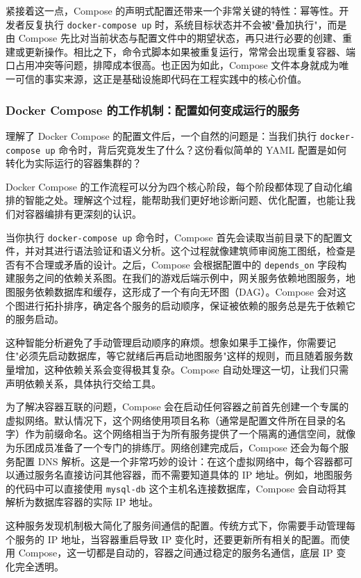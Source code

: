 紧接着这一点，Compose 的声明式配置还带来一个非常关键的特性：幂等性。开发者反复执行 \texttt{docker-compose up} 时，系统目标状态并不会被"叠加执行"，而是由 Compose 先比对当前状态与配置文件中的期望状态，再只进行必要的创建、重建或更新操作。相比之下，命令式脚本如果被重复运行，常常会出现重复容器、端口占用冲突等问题，排障成本很高。也正因为如此，Compose 文件本身就成为唯一可信的事实来源，这正是基础设施即代码在工程实践中的核心价值。

\subsubsection{Docker Compose 的工作机制：配置如何变成运行的服务}

理解了 Docker Compose 的配置文件后，一个自然的问题是：当我们执行 \texttt{docker-compose up} 命令时，背后究竟发生了什么？这份看似简单的 YAML 配置是如何转化为实际运行的容器集群的？

Docker Compose 的工作流程可以分为四个核心阶段，每个阶段都体现了自动化编排的智能之处。理解这个过程，能帮助我们更好地诊断问题、优化配置，也能让我们对容器编排有更深刻的认识。

当你执行 \texttt{docker-compose up} 命令时，Compose 首先会读取当前目录下的配置文件，并对其进行语法验证和语义分析。这个过程就像建筑师审阅施工图纸，检查是否有不合理或矛盾的设计。之后，Compose 会根据配置中的 \texttt{depends\_on} 字段构建服务之间的依赖关系图。在我们的游戏后端示例中，网关服务依赖地图服务，地图服务依赖数据库和缓存，这形成了一个有向无环图（DAG）。Compose 会对这个图进行拓扑排序，确定各个服务的启动顺序，保证被依赖的服务总是先于依赖它的服务启动。

这种智能分析避免了手动管理启动顺序的麻烦。想象如果手工操作，你需要记住"必须先启动数据库，等它就绪后再启动地图服务"这样的规则，而且随着服务数量增加，这种依赖关系会变得极其复杂。Compose 自动处理这一切，让我们只需声明依赖关系，具体执行交给工具。

为了解决容器互联的问题，Compose 会在启动任何容器之前首先创建一个专属的虚拟网络。默认情况下，这个网络使用项目名称（通常是配置文件所在目录的名字）作为前缀命名。这个网络相当于为所有服务提供了一个隔离的通信空间，就像为乐团成员准备了一个专门的排练厅。网络创建完成后，Compose 还会为每个服务配置 DNS 解析。这是一个非常巧妙的设计：在这个虚拟网络中，每个容器都可以通过服务名直接访问其他容器，而不需要知道具体的 IP 地址。例如，地图服务的代码中可以直接使用 \texttt{mysql-db} 这个主机名连接数据库，Compose 会自动将其解析为数据库容器的实际 IP 地址。

这种服务发现机制极大简化了服务间通信的配置。传统方式下，你需要手动管理每个服务的 IP 地址，当容器重启导致 IP 变化时，还要更新所有相关的配置。而使用 Compose，这一切都是自动的，容器之间通过稳定的服务名通信，底层 IP 变化完全透明。

